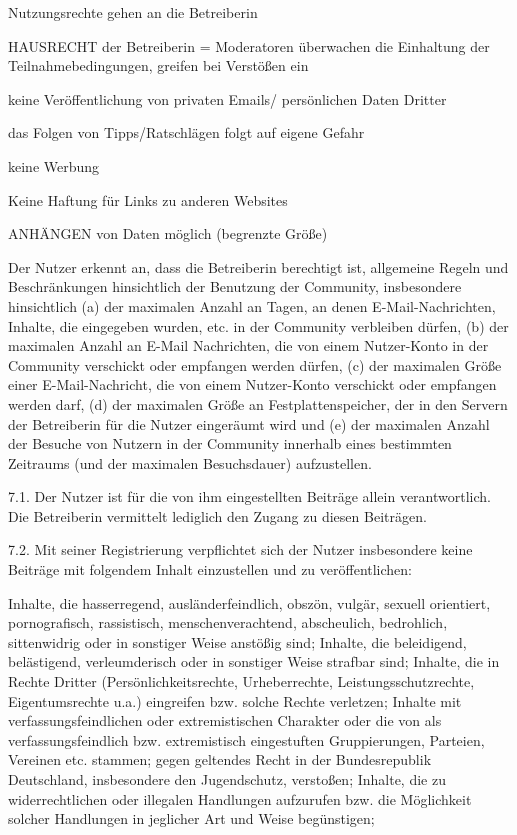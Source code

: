 Nutzungsrechte gehen an die Betreiberin

HAUSRECHT der Betreiberin = Moderatoren überwachen die Einhaltung der Teilnahmebedingungen, greifen bei Verstößen ein

keine Veröffentlichung von privaten Emails/ persönlichen Daten Dritter 

das Folgen von Tipps/Ratschlägen folgt auf eigene Gefahr

keine Werbung

Keine Haftung für Links zu anderen Websites

ANHÄNGEN von Daten möglich (begrenzte Größe)

Der Nutzer erkennt an, dass die Betreiberin berechtigt ist, allgemeine Regeln und Beschränkungen hinsichtlich der Benutzung der Community, insbesondere hinsichtlich (a) der maximalen Anzahl an Tagen, an denen E-Mail-Nachrichten, Inhalte, die eingegeben wurden, etc. in der Community verbleiben dürfen, (b) der maximalen Anzahl an E-Mail Nachrichten, die von einem Nutzer-Konto in der Community verschickt oder empfangen werden dürfen, (c) der maximalen Größe einer E-Mail-Nachricht, die von einem Nutzer-Konto verschickt oder empfangen werden darf, (d) der maximalen Größe an Festplattenspeicher, der in den Servern der Betreiberin für die Nutzer eingeräumt wird und (e) der maximalen Anzahl der Besuche von Nutzern in der Community innerhalb eines bestimmten Zeitraums (und der maximalen Besuchsdauer) aufzustellen.

7.1. Der Nutzer ist für die von ihm eingestellten Beiträge allein verantwortlich. Die Betreiberin vermittelt lediglich den Zugang zu diesen Beiträgen.

7.2. Mit seiner Registrierung verpflichtet sich der Nutzer insbesondere keine Beiträge mit folgendem Inhalt einzustellen und zu veröffentlichen:

    Inhalte, die hasserregend, ausländerfeindlich, obszön, vulgär, sexuell orientiert, pornografisch, rassistisch, menschenverachtend, abscheulich, bedrohlich, sittenwidrig oder in sonstiger Weise anstößig sind;
    Inhalte, die beleidigend, belästigend, verleumderisch oder in sonstiger Weise strafbar sind;
    Inhalte, die in Rechte Dritter (Persönlichkeitsrechte, Urheberrechte, Leistungsschutzrechte, Eigentumsrechte u.a.) eingreifen bzw. solche Rechte verletzen;
    Inhalte mit verfassungsfeindlichen oder extremistischen Charakter oder die von als verfassungsfeindlich bzw. extremistisch eingestuften Gruppierungen, Parteien, Vereinen etc. stammen;
    gegen geltendes Recht in der Bundesrepublik Deutschland, insbesondere den Jugendschutz, verstoßen;
    Inhalte, die zu widerrechtlichen oder illegalen Handlungen aufzurufen bzw. die Möglichkeit solcher Handlungen in jeglicher Art und Weise begünstigen;

